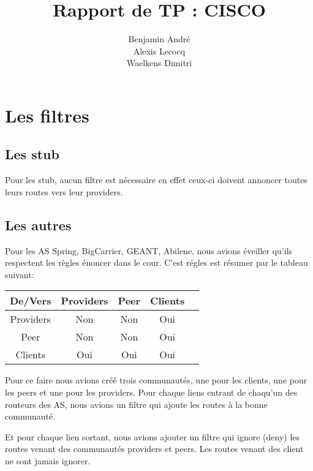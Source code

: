\documentclass{article}
\author{Benjamin André\\Alexis Lecocq\\Waelkens Dimitri}
\title{Rapport de TP : CISCO}
\begin{document}
\maketitle


\section{Les filtres}

\subsection{Les stub}
Pour les stub, aucun filtre est nécessaire en effet ceux-ci doivent annoncer toutes leurs routes vers leur providers.

\subsection{Les autres}

Pour les AS Spring, BigCarrier, GEANT, Abilene, nous avions éveiller qu'ils respectent les règles énoncer dans le cour. C'est régles est résumer par le tableau suivant:



\begin{tabular}{|c|c|c|c|c|}
\hline
De/Vers & Providers & Peer & Clients \\
\hline
 Providers & Non & Non & Oui \\
\hline
 Peer & Non & Non & Oui \\
\hline
  Clients & Oui & Oui & Oui \\
\hline

\end{tabular}


Pour ce faire nous avions créé trois communautés, une pour les clients, une pour les peers et une pour les providers. Pour chaque liens entrant de chaqu'un des routeurs des AS, nous avions un filtre qui ajoute les routes à la bonne communauté.

Et pour chaque lien sortant, nous avions ajouter un filtre qui ignore (deny) les routes venant des communautés providers et peers.
Les routes venant des client ne sont jamais ignorer.
\end{document}

